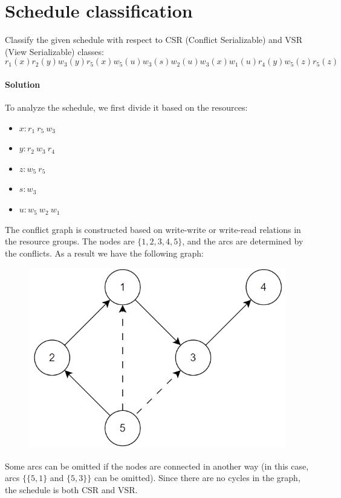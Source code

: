 \section{Schedule classification}

Classify the given schedule with respect to CSR (Conflict Serializable) and VSR (View Serializable) classes:
\[r_1(x) r_2(y) w_3(y) r_5(x) w_5(u) w_3(s)w_2(u) w_3(x) w_1(u) r_4(y) w_5(z) r_5(z)\]

\paragraph*{Solution}
To analyze the schedule, we first divide it based on the resources:
\begin{itemize}
    \item $x: r_1 \: r_5 \:w_3$
    \item $y: r_2 \: w_3 \:r_4$
    \item $z: w_5 \: r_5$
    \item $s: w_3$
    \item $u: w_5 \: w_2 \:w_1$
\end{itemize}
The conflict graph is constructed based on write-write or write-read relations in the resource groups. 
The nodes are $\{1,2,3,4,5\}$, and the arcs are determined by the conflicts. 
As a result we have the following graph:
\begin{figure}[H]
    \centering
    \includegraphics[width=0.5\linewidth]{images/conflictgraph.png}
\end{figure}
Some arcs can be omitted if the nodes are connected in another way (in this case, arcs $\{\{5,1\}$ and $\{5,3\}\}$ can be omitted).
Since there are no cycles in the graph, the schedule is both CSR and VSR.